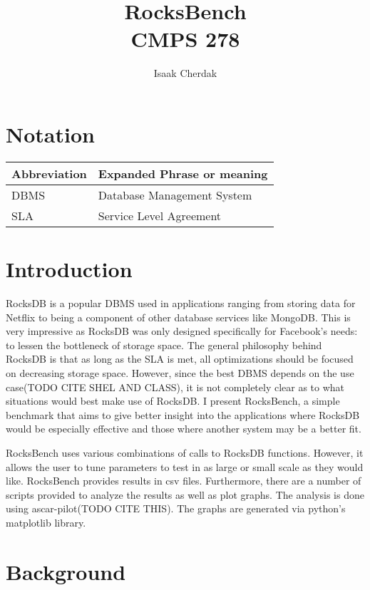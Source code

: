 \documentclass[twocolumn,11pt]{article}
\title{RocksBench\\CMPS 278}
\author{Isaak Cherdak}
\begin{document}
\maketitle

\pagebreak

\section*{Notation}

\begin{center}
  \begin{tabular}{ | l | l | }
    \hline
    Abbreviation & Expanded Phrase or meaning\\ \hline \hline
    DBMS & Database Management System\\ \hline
    SLA & Service Level Agreement\\ \hline
  \end{tabular}
\end{center}

\section{Introduction}
\label{sec:overview}

RocksDB is a popular DBMS used in applications ranging from storing data for
Netflix to being a component of other database services like MongoDB. This is
very impressive as RocksDB was only designed specifically for Facebook's needs:
to lessen the bottleneck of storage space. The general philosophy behind RocksDB
is that as long as the SLA is met, all optimizations should be focused on
decreasing storage space. However, since the best DBMS depends on the use
case(TODO CITE SHEL AND CLASS), it is not completely clear as to what situations
would best make use of RocksDB. I present RocksBench, a simple benchmark that
aims to give better insight into the applications where RocksDB would be
especially effective and those where another system may be a better fit.

RocksBench uses various combinations of calls to RocksDB functions. However, it
allows the user to tune parameters to test in as large or small scale as they
would like. RocksBench provides results in csv files. Furthermore, there are a
number of scripts provided to analyze the results as well as plot graphs. The
analysis is done using ascar-pilot(TODO CITE THIS). The graphs are generated via
python's matplotlib library.

\section{Background}
\label{sec:background}
\end{document}
